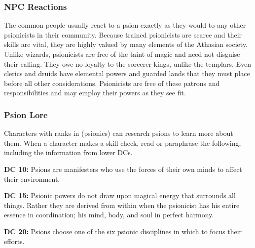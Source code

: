 \subsubsection{NPC Reactions}

The common people usually react to a psion exactly as they would to any other psionicists in their community. Because trained psionicists are scarce and their skills are vital, they are highly valued by many elements of the Athasian society. Unlike wizards, psionicists are free of the taint of magic and need not disguise their calling. They owe no loyalty to the sorcerer-kings, unlike the templars. Even clerics and druids have elemental powers and guarded lands that they must place before all other considerations. Psionicists are free of these patrons and responsibilities and may employ their powers as they see fit.

\subsubsection{Psion Lore}

Characters with ranks in  (psionics) can research psions to learn more about them. When a character makes a skill check, read or paraphrase the following, including the information from lower DCs.

\textbf{DC 10:} Psions are manifesters who use the forces of their own minds to affect their environment.

\textbf{DC 15:} Psionic powers do not draw upon magical energy that surrounds all things. Rather they are derived from within when the psionicist has his entire essence in coordination; his mind, body, and soul in perfect harmony.

\textbf{DC 20:} Psions choose one of the six psionic disciplines in which to focus their efforts.
